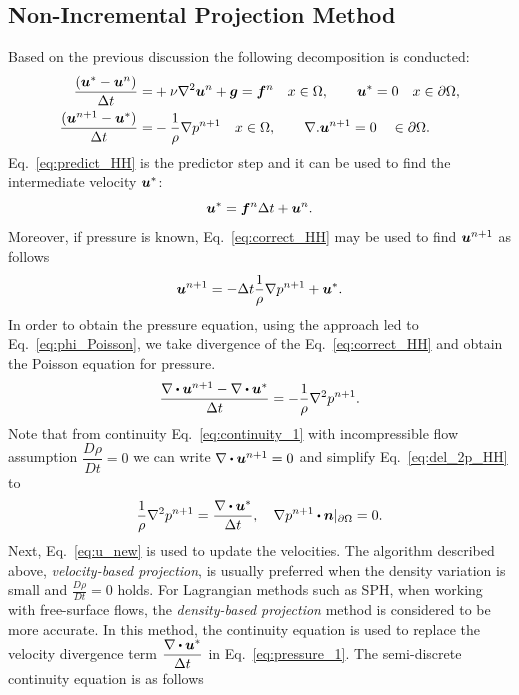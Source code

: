 \subsection{Non-Incremental Projection Method}
Based on the previous discussion the following decomposition is conducted: 
\begin{align}
\dfrac{(\boldsymbol{u}^*-\boldsymbol{u}^n)}{\Delta t}=&+\nu \nabla^2\boldsymbol{u}^n + \boldsymbol{g}=\boldsymbol{f}^n \quad x\in \Omega, \qquad \boldsymbol{u}^*=0 \quad x\in \partial\Omega,\label{eq:predict_HH} \\
\dfrac{(\boldsymbol{u}^{n+1}-\boldsymbol{u}^*)}{\Delta t}=&-\dfrac{1}{\rho} \nabla p^{n+1}\quad x\in \Omega, \qquad \nabla.\boldsymbol{u}^{n+1}=0 \quad \in \partial\Omega \label{eq:correct_HH}.
\end{align}
Eq.~\ref{eq:predict_HH} is the predictor step and it can be used to find the intermediate velocity $\boldsymbol{u}^*$:
\begin{equation}\label{eq:u_star}
\boldsymbol{u}^*=\boldsymbol{f}^n {\Delta t}+\boldsymbol{u}^n.
\end{equation}
Moreover, if pressure is known, Eq.~\ref{eq:correct_HH} may be used to find $\boldsymbol{u}^{n+1}$ as follows
\begin{equation}\label{eq:u_new}
\boldsymbol{u}^{n+1}=-{\Delta t}\dfrac{1}{\rho} \nabla p^{n+1}+\boldsymbol{u}^*.
\end{equation}
In order to obtain the pressure equation, using the approach led to Eq.~\ref{eq:phi_Poisson}, we take divergence of the Eq.~\ref{eq:correct_HH} and obtain the Poisson equation for pressure. 
\begin{equation}\label{eq:del_2p_HH}
\dfrac{\nabla \bigcdot \vect{u}^{n+1}-\nabla \bigcdot \vect{u}^*}{\Delta t}=-\dfrac{1}{\rho} \nabla^2 p^{n+1}.
\end{equation}
Note that from continuity Eq.~\ref{eq:continuity_1} with incompressible flow assumption $\dfrac{D\rho}{Dt}=0$ we can write  $\nabla \bigcdot \vect{u}^{n+1} =0$ and simplify Eq.~\ref{eq:del_2p_HH} to 
\begin{equation}\label{eq:pressure_1}
\dfrac{1}{\rho} \nabla^2 p^{n+1}=\dfrac{\nabla \bigcdot \vect{u}^*}{\Delta t}, \quad \nabla p^{n+1}\bigcdot\vect{n}|_{\partial \Omega}=0.
\end{equation}
Next, Eq.~\ref{eq:u_new} is used to update the velocities. The algorithm described above, \textit{velocity-based projection}, is usually preferred when the density variation is small and $\frac{D\rho}{Dt}=0$ holds. For Lagrangian methods such as SPH, when working with free-surface flows, the \textit{density-based projection} method is considered to be more accurate. In this method, the continuity equation is used to replace the velocity divergence term $\dfrac{\nabla\bigcdot \vect{u}^*}{\Delta t}$ in Eq.~\ref{eq:pressure_1}. The semi-discrete continuity equation is as follows
